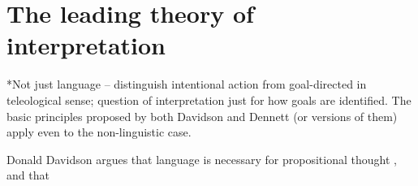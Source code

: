 \documentclass[12pt,letterpaper]{extarticle}
\begin{document}
\section{The leading theory of interpretation}

*Not just language -- distinguish intentional action from goal-directed in teleological sense; question of interpretation just for how goals are identified.  The basic principles proposed by both Davidson and Dennett (or versions of them) apply even to the non-linguistic case.

Donald Davidson argues that language is necessary for propositional thought \citep[p.\ 130]{Davidson:1999mo},
and that




\end{document}
